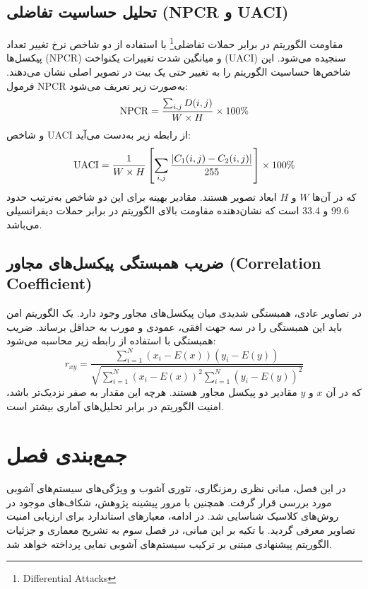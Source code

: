 \documentclass[a4paper,12pt]{report}
\renewcommand{\%}{\lr{\oldpercent}}
\providecommand{\lr}[1]{#1}
\providecommand{\LTRfootnote}[1]{\footnote{#1}}
\begin{document}
\subsection{تحلیل حساسیت تفاضلی (\protect\lr{NPCR} و \protect\lr{UACI})}
مقاومت الگوریتم در برابر حملات تفاضلی\LTRfootnote{Differential Attacks} با استفاده از دو شاخص نرخ تغییر تعداد پیکسل‌ها (\lr{NPCR}) و میانگین شدت تغییرات یکنواخت (\lr{UACI}) سنجیده می‌شود. این شاخص‌ها حساسیت الگوریتم را به تغییر حتی یک بیت در تصویر اصلی نشان می‌دهند.
فرمول \lr{NPCR} به‌صورت زیر تعریف می‌شود:
\begin{equation} \label{eq:npcr_def}
\mathrm{NPCR} = \frac{\sum_{i,j} D(i,j)}{W \times H} \times 100\text{\%}
\end{equation}
و شاخص \lr{UACI} از رابطه زیر به‌دست می‌آید:
\begin{equation} \label{eq:uaci_def}
\mathrm{UACI} = \frac{1}{W \times H} \left[ \sum_{i,j} \frac{|C_1(i,j) - C_2(i,j)|}{255} \right] \times 100\text{\%}
\end{equation}
که در آن‌ها $W$ و $H$ ابعاد تصویر هستند. مقادیر بهینه برای این دو شاخص به‌ترتیب حدود \lr{99.6\%} و \lr{33.4\%} است که نشان‌دهنده مقاومت بالای الگوریتم در برابر حملات دیفرانسیلی می‌باشد\cite{ref3}.

\subsection{ضریب همبستگی پیکسل‌های مجاور (\lr{Correlation Coefficient})}
در تصاویر عادی، همبستگی شدیدی میان پیکسل‌های مجاور وجود دارد. یک الگوریتم امن باید این همبستگی را در سه جهت افقی، عمودی و مورب به حداقل برساند. ضریب همبستگی با استفاده از رابطه زیر محاسبه می‌شود:
\begin{equation} \label{eq:correlation_def}
r_{xy} = \frac{\sum_{i=1}^N (x_i - E(x))(y_i - E(y))}{\sqrt{\sum_{i=1}^N (x_i - E(x))^2 \sum_{i=1}^N (y_i - E(y))^2}}
\end{equation}
که در آن $x$ و $y$ مقادیر دو پیکسل مجاور هستند. هرچه این مقدار به صفر نزدیک‌تر باشد، امنیت الگوریتم در برابر تحلیل‌های آماری بیشتر است\cite{ref10}.

\section{جمع‌بندی فصل}
در این فصل، مبانی نظری رمزنگاری، تئوری آشوب و ویژگی‌های سیستم‌های آشوبی مورد بررسی قرار گرفت. همچنین با مرور پیشینه پژوهش، شکاف‌های موجود در روش‌های کلاسیک شناسایی شد. در ادامه، معیارهای استاندارد برای ارزیابی امنیت تصاویر معرفی گردید. با تکیه بر این مبانی، در فصل سوم به تشریح معماری و جزئیات الگوریتم پیشنهادی مبتنی بر ترکیب سیستم‌های آشوبی نمایی پرداخته خواهد شد.
\end{document}

